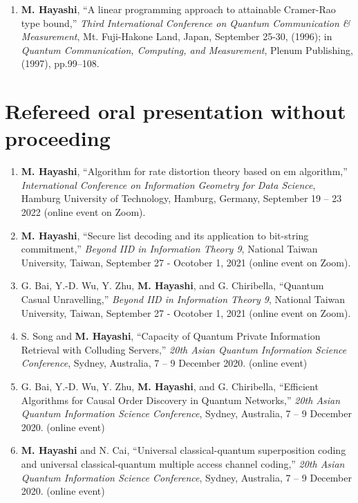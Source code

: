 \documentclass[a4paper,12pt,oneside]{article}
\begin{document}
\begin{enumerate}
    \item
    \textbf{M. Hayashi}, ``A linear programming approach to attainable Cramer-Rao type bound,'' 
    {\em Third International Conference on Quantum Communication \& Measurement}, 
    Mt. Fuji-Hakone Land, Japan, September 25-30, (1996);
    in {\em Quantum Communication, Computing, and Measurement}, Plenum Publishing, (1997), 
    pp.99--108.
\end{enumerate}

\section{Refereed oral presentation without proceeding}
\begin{enumerate}

\item
\textbf{M. Hayashi},
``Algorithm for rate distortion theory based on em algorithm,''
{\em International Conference on Information Geometry for Data Science},
Hamburg University of Technology, Hamburg, Germany, September 19 – 23 2022 (online event on Zoom).

\item
\textbf{M. Hayashi},
``Secure list decoding and its application to bit-string commitment,''
{\em Beyond IID in Information Theory 9},
National Taiwan University, Taiwan, September 27 - Ocotober 1, 2021 (online event on Zoom).

\item
G. Bai, Y.-D. Wu, Y. Zhu, \textbf{M. Hayashi}, and G. Chiribella,
``Quantum Casual Unravelling,''
{\em Beyond IID in Information Theory 9},
National Taiwan University, Taiwan, September 27 - Ocotober 1, 2021 (online event on Zoom).

\item
S. Song and \textbf{M. Hayashi},
``Capacity of Quantum Private Information Retrieval with Colluding Servers,''
{\em 20th Asian Quantum Information Science Conference},
Sydney, Australia, 7 -- 9 December 2020. (online event)

\item
G. Bai, Y.-D. Wu, Y. Zhu, \textbf{M. Hayashi}, and G. Chiribella,
``Efficient Algorithms for Causal Order Discovery in Quantum Networks,''
{\em 20th Asian Quantum Information Science Conference},
Sydney, Australia, 7 -- 9 December 2020. (online event)

\item
\textbf{M. Hayashi} and N. Cai,
``Universal classical-quantum superposition coding and universal classical-quantum multiple access channel coding,''
{\em 20th Asian Quantum Information Science Conference},
Sydney, Australia, 7 -- 9 December 2020. (online event)


\end{enumerate}
\end{document}
